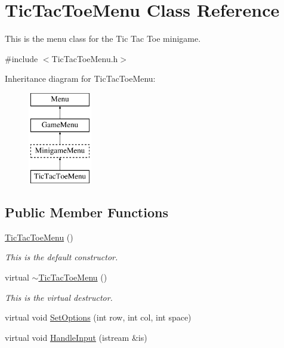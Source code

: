 \hypertarget{classTicTacToeMenu}{\section{Tic\-Tac\-Toe\-Menu Class Reference}
\label{classTicTacToeMenu}
}


This is the menu class for the Tic Tac Toe minigame.  




{\ttfamily \#include $<$Tic\-Tac\-Toe\-Menu.\-h$>$}

Inheritance diagram for Tic\-Tac\-Toe\-Menu\-:\begin{figure}[H]
\begin{center}
\leavevmode
\includegraphics[height=4.000000cm]{classTicTacToeMenu}
\end{center}
\end{figure}
\subsection*{Public Member Functions}
\begin{DoxyCompactItemize}
\item 
\hyperlink{classTicTacToeMenu_a15e92bc5e44266bbc23bbce421186dad}{Tic\-Tac\-Toe\-Menu} ()
\begin{DoxyCompactList}\small\item\em This is the default constructor. \end{DoxyCompactList}\item 
virtual \hyperlink{classTicTacToeMenu_a429d4d036694b8d96b08896f50d5f19b}{$\sim$\-Tic\-Tac\-Toe\-Menu} ()
\begin{DoxyCompactList}\small\item\em This is the virtual destructor. \end{DoxyCompactList}\item 
virtual void \hyperlink{classTicTacToeMenu_ab736aba3ecb23a6b28cde04729556088}{Set\-Options} (int row, int col, int space)
\item 
virtual void \hyperlink{classTicTacToeMenu_a11191814019309260bb4270c03891e5e}{Handle\-Input} (istream \&is)
\end{DoxyCompactItemize}
